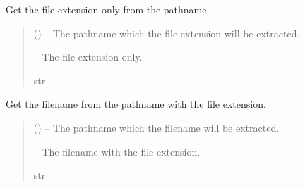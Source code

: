\documentclass[letterpaper,11pt,english]{sphinxmanual}
\begin{document}
\begin{savenotes}\begin{fulllineitems}
\label{\detokenize{code/lezargus.library.path:lezargus.library.path.get_file_extension}}
\pysigstartsignatures
{}
\pysigstopsignatures
\sphinxAtStartPar
Get the file extension only from the pathname.
\begin{quote}\begin{description}
\sphinxAtStartPar
{} () – The pathname which the file extension will be extracted.

\sphinxAtStartPar
{} – The file extension only.

\sphinxAtStartPar
str

\end{description}\end{quote}

\end{fulllineitems}\end{savenotes}


\begin{savenotes}\begin{fulllineitems}
\label{\detokenize{code/lezargus.library.path:lezargus.library.path.get_filename_with_extension}}
\pysigstartsignatures
{}
\pysigstopsignatures
\sphinxAtStartPar
Get the filename from the pathname with the file extension.
\begin{quote}\begin{description}
\sphinxAtStartPar
{} () – The pathname which the filename will be extracted.

\sphinxAtStartPar
{} – The filename with the file extension.

\sphinxAtStartPar
str

\end{description}\end{quote}

\end{fulllineitems}\end{savenotes}
\end{document}
